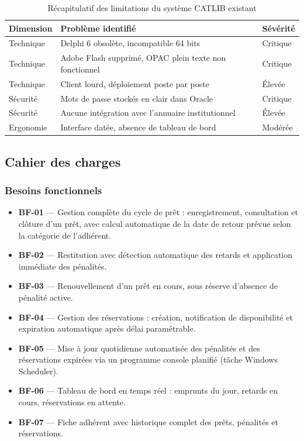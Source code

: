 \begin{table}[H]
\centering
\caption{Récapitulatif des limitations du système CATLIB existant}
\label{tab:critique}
\renewcommand{\arraystretch}{1.45}
\begin{tabular}{|p{2.8cm}|p{8.5cm}|p{2cm}|}
\hline

\textbf{Dimension} & \textbf{Problème identifié} & \textbf{Sévérité} \\
\hline
Technique & Delphi 6 obsolète, incompatible 64 bits & Critique \\
\hline
Technique & Adobe Flash supprimé, OPAC plein texte non fonctionnel & Critique \\
\hline
Technique & Client lourd, déploiement poste par poste & Élevée \\
\hline
Sécurité & Mots de passe stockés en clair dans Oracle & Critique \\
\hline
Sécurité & Aucune intégration avec l'annuaire institutionnel & Élevée \\
\hline

Ergonomie & Interface datée, absence de tableau de bord & Modérée \\
\hline

\end{tabular}
\end{table}

\FloatBarrier

\subsection{Cahier des charges}

\subsubsection{Besoins fonctionnels}

\begin{itemize}
    \item \textbf{BF-01} — Gestion complète du cycle de prêt : enregistrement,
    consultation et clôture d'un prêt, avec calcul automatique de la date de
    retour prévue selon la catégorie de l'adhérent.
    \item \textbf{BF-02} — Restitution avec détection automatique des retards
    et application immédiate des pénalités.
    \item \textbf{BF-03} — Renouvellement d'un prêt en cours, sous réserve
    d'absence de pénalité active.
    \item \textbf{BF-04} — Gestion des réservations : création, notification
    de disponibilité et expiration automatique après délai paramétrable.
    \item \textbf{BF-05} — Mise à jour quotidienne automatisée des pénalités
    et des réservations expirées via un programme console planifié (tâche
    Windows Scheduler).
    \item \textbf{BF-06} — Tableau de bord en temps réel : emprunts du jour,
    retards en cours, réservations en attente.
    \item \textbf{BF-07} — Fiche adhérent avec historique complet des prêts,
    pénalités et réservations.
\end{itemize}


